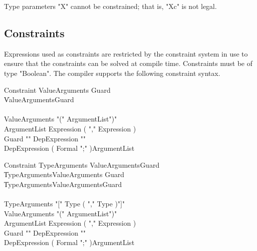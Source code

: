Type parameters \xcd"X" cannot be constrained; that is,
\xcd"X{c}" is not legal.

\subsection{Constraints}
\label{sec:constraints}

\def\withmath#1{\relax\ifmmode#1\else{$#1$}\fi}
\def\LL#1{\withmath{\lbrack\!\lbrack #1\rbrack\!\rbrack}}

% 

Expressions used as constraints are restricted by the
constraint system in use to ensure that the constraints can
be solved at compile time.
Constraints must be of type \xcd"Boolean".
The compiler supports the following constraint syntax.

\iftypeparams

\begin{grammar}
Constraint \: ValueArguments     Guard\opt \\
           \| ValueArguments\opt Guard     \\
           \\
ValueArguments   \:  \xcd"(" ArgumentList\opt \xcd")" \\
ArgumentList     \:  Expression ( \xcd"," Expression )\star \\
Guard            \: \xcd"{" DepExpression \xcd"}" \\
DepExpression    \: ( Formal \xcd";" )\star ArgumentList \\
\end{grammar}

\else

\begin{grammar}
Constraint \: TypeArguments     ValueArguments\opt Guard\opt \\
           \| TypeArguments\opt ValueArguments     Guard\opt \\
           \| TypeArguments\opt ValueArguments\opt Guard     \\
           \\
TypeArguments    \:  \xcd"[" Type ( \xcd"," Type )\star \xcd"]" \\
ValueArguments   \:  \xcd"(" ArgumentList\opt \xcd")" \\
ArgumentList     \:  Expression ( \xcd"," Expression )\star \\
Guard            \: \xcd"{" DepExpression \xcd"}" \\
DepExpression    \: ( Formal \xcd";" )\star ArgumentList \\
\end{grammar}

